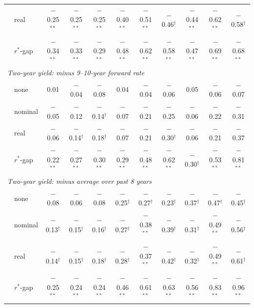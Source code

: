 \begin{tabular}{llccccccccc}
 & real & $-$0.25$^{**}$ & $-$0.25$^{**}$ & $-$0.25$^{**}$ & $-$0.40$^{**}$ & $-$0.51$^{**}$ & $-$0.46$^{\dagger}$ & $-$0.44$^{**}$ & $-$0.62$^{**}$ & $-$0.58$^{\dagger}$ \\
 & $r^*$-gap & $-$0.34$^{**}$ & $-$0.33$^{**}$ & $-$0.29$^{**}$ & $-$0.48$^{**}$ & $-$0.62$^{**}$ & $-$0.58$^{**}$ & $-$0.47$^{**}$ & $-$0.69$^{**}$ & $-$0.68$^{**}$ \\
\midrule
\multicolumn{11}{l}{\textit{Two-year yield: minus 9--10-year forward rate}}\\
 & none & 0.01 & $-$0.04 & $-$0.08 & 0.04 & $-$0.04 & $-$0.06 & 0.05 & $-$0.06 & $-$0.07 \\
 & nominal & $-$0.05 & $-$0.12 & $-$0.14$^{\dagger}$ & $-$0.07 & $-$0.21 & $-$0.25 & $-$0.06 & $-$0.22 & $-$0.31 \\
 & real & $-$0.06 & $-$0.14$^{\dagger}$ & $-$0.18$^{\dagger}$ & $-$0.07 & $-$0.21 & $-$0.30$^{\dagger}$ & $-$0.06 & $-$0.21 & $-$0.37 \\
 & $r^*$-gap & $-$0.22$^{**}$ & $-$0.27$^{**}$ & $-$0.30$^{**}$ & $-$0.29$^{**}$ & $-$0.48$^{**}$ & $-$0.62$^{**}$ & $-$0.30$^{\dagger}$ & $-$0.53$^{**}$ & $-$0.81$^{**}$ \\
\midrule
\multicolumn{11}{l}{\textit{Two-year yield: minus average over past 8 years}}\\
 & none & $-$0.08 & $-$0.06 & $-$0.08 & $-$0.25$^{\dagger}$ & $-$0.27$^{\dagger}$ & $-$0.23$^{\dagger}$ & $-$0.37$^{\dagger}$ & $-$0.47$^{\dagger}$ & $-$0.45$^{\dagger}$ \\
 & nominal & $-$0.13$^{\dagger}$ & $-$0.15$^{\dagger}$ & $-$0.16$^{\dagger}$ & $-$0.27$^{\dagger}$ & $-$0.38$^{**}$ & $-$0.39$^{\dagger}$ & $-$0.31$^{\dagger}$ & $-$0.49$^{**}$ & $-$0.56$^{\dagger}$ \\
 & real & $-$0.14$^{\dagger}$ & $-$0.15$^{\dagger}$ & $-$0.18$^{\dagger}$ & $-$0.28$^{\dagger}$ & $-$0.37$^{**}$ & $-$0.42$^{\dagger}$ & $-$0.32$^{\dagger}$ & $-$0.49$^{**}$ & $-$0.61$^{\dagger}$ \\
 & $r^*$-gap & $-$0.25$^{**}$ & $-$0.24$^{**}$ & $-$0.24$^{**}$ & $-$0.46$^{**}$ & $-$0.61$^{**}$ & $-$0.63$^{**}$ & $-$0.56$^{**}$ & $-$0.83$^{**}$ & $-$0.96$^{**}$ \\
\bottomrule
\end{tabular}
